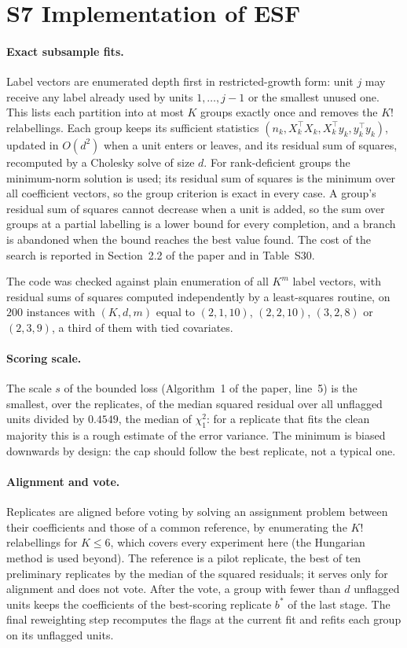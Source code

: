 \clearpage
\section*{S7 Implementation of ESF}
\label{app:implementation}

\paragraph{Exact subsample fits.}
Label vectors are enumerated depth first in restricted-growth form: unit $j$ may receive any
label already used by units $1,\dots,j-1$ or the smallest unused one. This lists each
partition into at most $K$ groups exactly once and removes the $K!$ relabellings. Each group
keeps its sufficient statistics $(n_k,X_k^{\top}X_k,X_k^{\top}y_k,y_k^{\top}y_k)$, updated in
$O(d^{2})$ when a unit enters or leaves, and its residual sum of squares, recomputed by a
Cholesky solve of size $d$. For rank-deficient groups the minimum-norm solution is used; its
residual sum of squares is the minimum over all coefficient vectors, so the group criterion is
exact in every case. A group's residual sum of squares cannot decrease when a unit is added,
so the sum over groups at a partial labelling is a lower bound for every completion, and a
branch is abandoned when the bound reaches the best value found. The cost of the search is reported in Section~2.2 of the paper and in Table~S30.

The code was
checked against plain enumeration of all $K^{m}$ label vectors, with residual sums of squares
computed independently by a least-squares routine, on $200$ instances with $(K,d,m)$ equal
to $(2,1,10)$, $(2,2,10)$, $(3,2,8)$ or $(2,3,9)$, a third of them with tied covariates.

\paragraph{Scoring scale.} The scale $s$ of the bounded loss (Algorithm~1 of the paper, line~5) is the smallest, over the replicates, of the median
squared residual over all unflagged units divided by $0.4549$, the median of $\chi^{2}_1$: for a
replicate that fits the clean majority this is a rough estimate of the error variance. The
minimum is biased downwards by design: the cap should follow the best replicate, not a
typical one.

\paragraph{Alignment and vote.}
Replicates are aligned before voting by solving an assignment problem between their coefficients
and those of a common reference, by enumerating the $K!$ relabellings for $K\le6$, which covers
every experiment here (the Hungarian method \citep{kuhn1955hungarian} is used beyond). The
reference is a pilot replicate, the best of ten preliminary replicates by the median of the
squared residuals; it serves only for alignment and does not vote. After the vote, a group with
fewer than $d$ unflagged units keeps the coefficients of the best-scoring replicate $b^{\ast}$ of
the last stage. The final reweighting step recomputes the flags at the current fit and refits
each group on its unflagged units.

